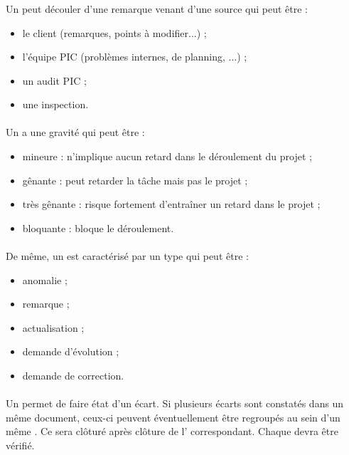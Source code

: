 \subsubsection*{\FT}
\paragraph*{} Un \FT{} peut découler d'une remarque venant d'une source qui peut être :

\begin{itemize}
	\item le client (remarques, points à modifier...) ;
	\item l'équipe PIC (problèmes internes, de planning, ...) ;
	\item un audit PIC ;
	\item une inspection.
\end{itemize}

\paragraph*{} Un \FTCourt{} a une gravité qui peut être :
\begin{itemize}
\item mineure : n'implique aucun retard dans le déroulement du projet ;
\item gênante : peut retarder la tâche mais pas le projet ;
\item très gênante : risque fortement d'entraîner un retard dans le projet ;
\item bloquante : bloque le déroulement.
\end{itemize}

\paragraph*{} De même, un \FTCourt est caractérisé par un type qui peut être :
\begin{itemize}
\item anomalie ;
\item remarque ;
\item actualisation ;
\item demande d'évolution ;
\item demande de correction.
\end{itemize}

\paragraph*{} Un \FTCourt{} permet de faire état d'un écart. Si plusieurs écarts sont constatés dans un même
document, ceux-ci peuvent éventuellement être regroupés au sein d'un même \FTCourt . Ce \FTCourt{} sera
clôturé après clôture de l'\OCCourt{} correspondant. Chaque \OCCourt{} devra être vérifié.

